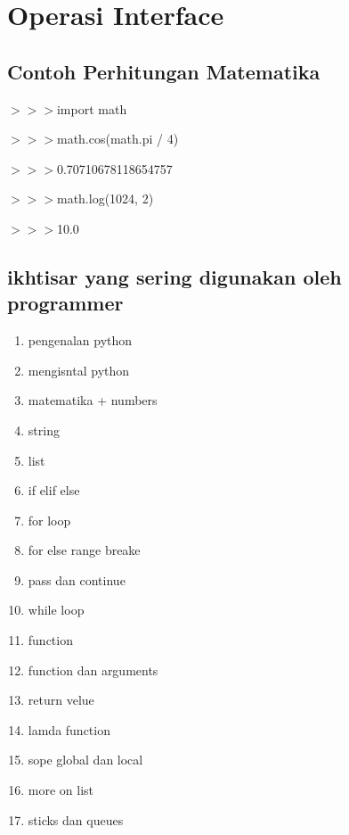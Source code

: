 \section{Operasi Interface}

\subsection{Contoh Perhitungan Matematika}


$>$$>$$>$import math 

$>$$>$$>$math.cos(math.pi / 4) 

$>$$>$$>$0.70710678118654757 

$>$$>$$>$math.log(1024, 2) 

$>$$>$$>$10.0 
  
\subsection
{ikhtisar yang sering digunakan oleh programmer}
\begin{enumerate}
	\item pengenalan python
	\item mengisntal python
\item	matematika + numbers
\item	string
	\item list
\item	if elif else
\item	for loop
\item	for else range breake
\item	pass dan continue 
\item	while loop
\item	function
\item	function dan arguments
\item	return velue
\item	lamda function
\item	sope global dan local
\item	more on list
\item	sticks dan queues
	
\end{enumerate}
